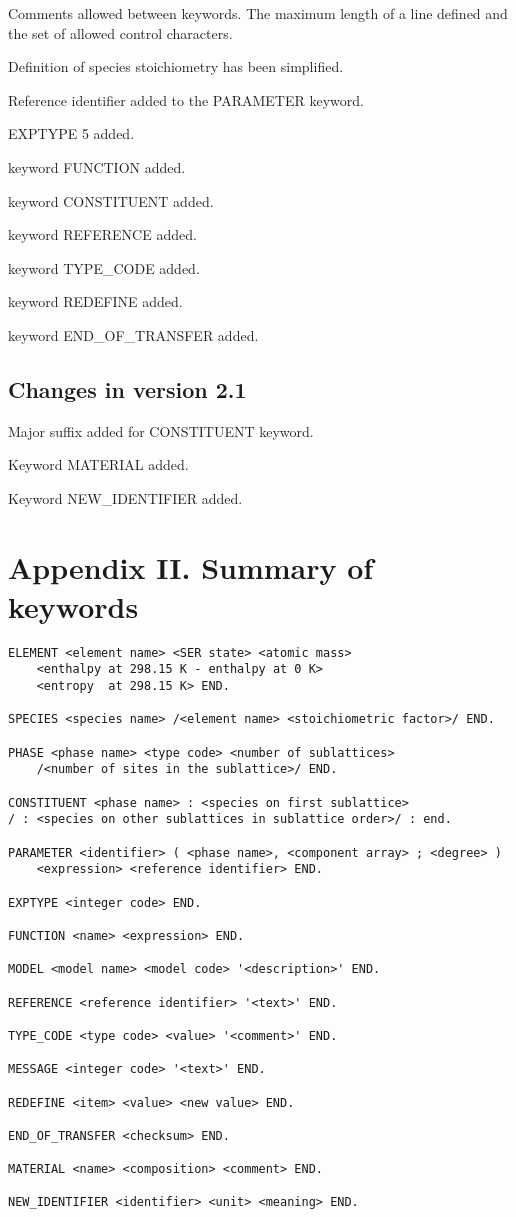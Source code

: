 \documentclass[12pt]{article}
\begin{document}
Comments allowed between keywords. The maximum length of a line
defined and the set of allowed control characters.

Definition of species stoichiometry has been simplified.

Reference identifier added to the PARAMETER keyword.

EXPTYPE 5 added.

keyword FUNCTION added.

keyword CONSTITUENT added.

keyword REFERENCE added.

keyword TYPE\_CODE added.

keyword REDEFINE added.

keyword END\_OF\_TRANSFER added.

\subsection{Changes in version 2.1}

Major suffix added for CONSTITUENT keyword.

Keyword MATERIAL added.

Keyword NEW\_IDENTIFIER added.

\section{Appendix II. Summary of keywords}

\begin{verbatim}
ELEMENT <element name> <SER state> <atomic mass>
    <enthalpy at 298.15 K - enthalpy at 0 K>
    <entropy  at 298.15 K> END.

SPECIES <species name> /<element name> <stoichiometric factor>/ END.

PHASE <phase name> <type code> <number of sublattices>
    /<number of sites in the sublattice>/ END.

CONSTITUENT <phase name> : <species on first sublattice> 
/ : <species on other sublattices in sublattice order>/ : end.

PARAMETER <identifier> ( <phase name>, <component array> ; <degree> )
    <expression> <reference identifier> END.

EXPTYPE <integer code> END.

FUNCTION <name> <expression> END.

MODEL <model name> <model code> '<description>' END.

REFERENCE <reference identifier> '<text>' END.

TYPE_CODE <type code> <value> '<comment>' END.

MESSAGE <integer code> '<text>' END.

REDEFINE <item> <value> <new value> END.

END_OF_TRANSFER <checksum> END.

MATERIAL <name> <composition> <comment> END.

NEW_IDENTIFIER <identifier> <unit> <meaning> END.
\end{verbatim}
\end{document}
